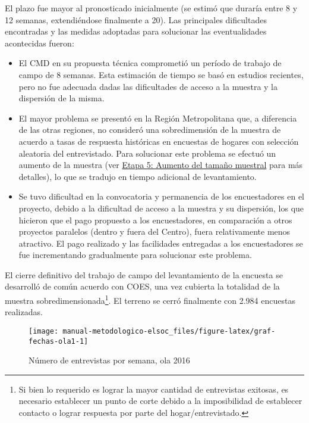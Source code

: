 \documentclass[
  12pt,
]{article}
\begin{document}
El plazo fue mayor al pronosticado inicialmente (se estimó que duraría entre 8 y 12 semanas, extendiéndose finalmente a 20). Las principales dificultades encontradas y las medidas adoptadas para solucionar las eventualidades acontecidas fueron:

\begin{itemize}
\item
  El CMD en su propuesta técnica comprometió un período de trabajo de campo de 8 semanas. Esta estimación de tiempo se basó en estudios recientes, pero no fue adecuada dadas las dificultades de acceso a la muestra y la dispersión de la misma.
\item
  El mayor problema se presentó en la Región Metropolitana que, a diferencia de las otras regiones, no consideró una sobredimensión de la muestra de acuerdo a tasas de respuesta históricas en encuestas de hogares con selección aleatoria del entrevistado. Para solucionar este problema se efectuó un aumento de la muestra (ver \protect\hyperlink{etapa5}{Etapa 5: Aumento del tamaño muestral} para más detalles), lo que se tradujo en tiempo adicional de levantamiento.
\item
  Se tuvo dificultad en la convocatoria y permanencia de los encuestadores en el proyecto, debido a la dificultad de acceso a la muestra y su dispersión, los que hicieron que el pago propuesto a los encuestadores, en comparación a otros proyectos paralelos (dentro y fuera del Centro), fuera relativamente menos atractivo. El pago realizado y las facilidades entregadas a los encuestadores se fue incrementando gradualmente para solucionar este problema.
\end{itemize}

El cierre definitivo del trabajo de campo del levantamiento de la encuesta se desarrolló de común acuerdo con COES, una vez cubierta la totalidad de la muestra sobredimensionada\footnote{Si bien lo requerido es lograr la mayor cantidad de entrevistas exitosas, es necesario establecer un punto de corte debido a la imposibilidad de establecer contacto o lograr respuesta por parte del hogar/entrevistado.}. El terreno se cerró finalmente con 2.984 encuestas realizadas.

\begin{figure}

{\centering \texttt{[image: manual-metodologico-elsoc\_files/figure-latex/graf-fechas-ola1-1]} 

}

\caption{Número de entrevistas por semana, ola 2016}\label{fig:graf-fechas-ola1}
\end{figure}
\end{document}
